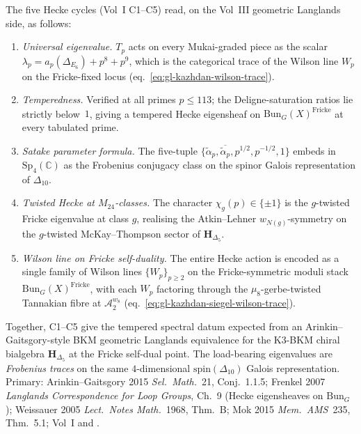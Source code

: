 \begin{remark}
\label{rem:gl-kazhdan-eigensheaf-closure}
The five Hecke cycles (Vol~I C1--C5) read, on the Vol~III
geometric Langlands side, as follows:
\begin{enumerate}[label=(C\arabic*)]
\item \emph{Universal eigenvalue.} $T_p$ acts on every Mukai-graded
piece as the scalar $\lambda_p = a_p(\Delta_{E_6}) + p^8 + p^9$, which
is the categorical trace of the Wilson line $W_p$ on the Fricke-fixed
locus (eq.~\ref{eq:gl-kazhdan-wilson-trace}).
\item \emph{Temperedness.} Verified at all primes $p\le 113$;
the Deligne-saturation ratios lie strictly
below~$1$, giving a tempered Hecke eigensheaf on
$\mathrm{Bun}_G(X)^{\mathrm{Fricke}}$ at every tabulated prime.
\item \emph{Satake parameter formula.} The five-tuple
$\{\tilde\alpha_p, \overline{\tilde\alpha_p}, p^{1/2}, p^{-1/2}, 1\}$
embeds in $\mathrm{Sp}_4(\mathbb{C})$ as the Frobenius conjugacy class
on the spinor Galois representation of $\Delta_{10}$.
\item \emph{Twisted Hecke at $M_{24}$-classes.} The character
$\chi_g(p)\in\{\pm 1\}$ is the $g$-twisted Fricke eigenvalue at class
$g$, realising the Atkin--Lehner $w_{N(g)}$-symmetry on the
$g$-twisted McKay--Thompson sector of $\mathbf{H}_{\Delta_5}$.
\item \emph{Wilson line on Fricke self-duality.} The entire Hecke
action is encoded as a single family of Wilson lines $\{W_p\}_{p\ge 2}$
on the Fricke-symmetric moduli stack
$\mathrm{Bun}_G(X)^{\mathrm{Fricke}}$, with each $W_p$ factoring
through the $\mu_8$-gerbe-twisted Tannakian fibre at
$\mathcal{A}_2^{w_8}$ (eq.~\ref{eq:gl-kazhdan-siegel-wilson-trace}).
\end{enumerate}
Together, C1--C5 give the tempered spectral datum expected from an
Arinkin--Gaitsgory-style BKM geometric Langlands equivalence for the
K3-BKM chiral bialgebra $\mathbf{H}_{\Delta_5}$ at the Fricke self-dual
point. The load-bearing eigenvalues are \emph{Frobenius traces} on the
same $4$-dimensional $\mathrm{spin}(\Delta_{10})$ Galois representation.
Primary: Arinkin--Gaitsgory 2015 \emph{Sel.~Math.}~21, Conj.~1.1.5;
Frenkel 2007 \emph{Langlands Correspondence for Loop Groups}, Ch.~9
(Hecke eigensheaves on $\mathrm{Bun}_G$); Weissauer 2005
\emph{Lect.~Notes Math.}~1968, Thm.~B;
Mok 2015 \emph{Mem.~AMS}~235, Thm.~5.1;
Vol~I \cite{VolI} and
\cite{VolI}.
\end{remark}
